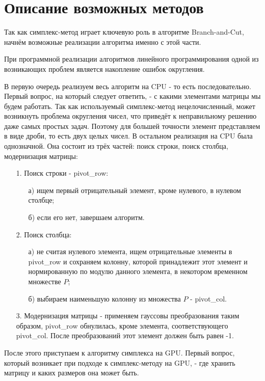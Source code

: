 \documentclass[a4paper,14pt,russian]{extreport}
\begin{document}
\section{Описание возможных методов}

Так как симплекс-метод играет ключевую роль в алгоритме Branch-and-Cut, начнём возможные реализации алгоритма именно с этой части.  
\par
При программной реализации алгоритмов линейного программирования одной из возникающих проблем является накопление ошибок округления. 
\par
В первую очередь реализуем весь алгоритм на CPU - то есть последовательно. Первый вопрос, на который следует ответить, - с какими элементами матрицы мы будем работать. Так как используемый симплекс-метод нецелочисленный, может возникнуть проблема округления чисел, что приведёт к неправильному решению даже самых простых задач. Поэтому для большей точности элемент представляем в виде дроби, то есть двух целых чисел. В остальном реализация на CPU была однозначной. Она состоит из трёх частей: поиск строки, поиск столбца, модернизация матрицы:
\begin{enumerate}
\item[1.] Поиск строки - pivot\_row:
  \begin{enumerate}
  \item[а)] ищем первый отрицательный элемент, кроме нулевого, в нулевом столбце;
  \item[б)] если его нет, завершаем алгоритм.
  \end{enumerate}
\item[2.] Поиск столбца:
  \begin{enumerate}
  \item[а)] не считая нулевого элемента, ищем отрицательные элементы в pivot\_row и сохраняем колонну, которой принадлежит этот элемент и нормированную по модулю данного элемента, в некотором временном множестве $P$;
  \item[б)] выбираем наименьшую колонну из множества $P$ - pivot\_col.
  \end{enumerate}
\item[3.] Модернизация матрицы - применяем гауссовы преобразования таким образом, pivot\_row обнулилась, кроме элемента, соответствующего pivot\_col. После преобразований этот элемент должен быть равен -1.
\end{enumerate}
\par
После этого приступаем к алгоритму симплекса на GPU. Первый вопрос, который возникает при подходе к симплекс-методу на GPU, - где хранить матрицу и каких размеров она может быть. 
\end{document}
